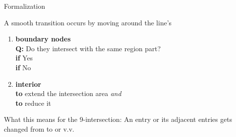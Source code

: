 	
	\begin{frame}{Formalization}
		\begin{block}{A smooth transition occurs by moving around the line's}
		\begin{enumerate}
			\item \textbf{boundary nodes}\\ \vspace{6pt}
			\textbf{Q:} Do they intersect with the same region part?\\
			 \textbf{if} Yes\\
			 \textbf{if} No
			
			\item \textbf{interior}\\ \vspace{6pt}
			 \textbf{to} extend the intersection area \textit{and}\\
			 \textbf{to} reduce it
		\end{enumerate}
		\end{block}
		
		\begin{block}{What this means for the 9-intersection:}
			 An entry or its adjacent entries gets changed from \Empty{} to \NotEmpty{} or v.v.
		\end{block}
	\end{frame}

	
